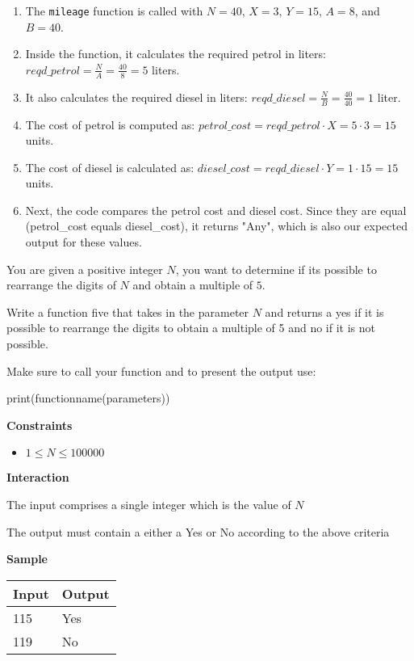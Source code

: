 \documentclass[a4paper]{exam}
\newcommand\heading[1]{\textbf{#1}}
\newcommand\alert[2]{\centerline{\textbf\large{\underline{\color{#1}{#2}}}}}
\begin{document}
\begin{questions}
\begin{enumerate}
    \item The \texttt{mileage} function is called with $N=40$, $X=3$, $Y=15$, $A=8$, and $B=40$.
    \item Inside the function, it calculates the required petrol in liters: $reqd\_petrol = \frac{N}{A} = \frac{40}{8} = 5$ liters.
    \item  It also calculates the required diesel in liters: $reqd\_diesel = \frac{N}{B} = \frac{40}{40} = 1$ liter.
    \item The cost of petrol is computed as: $petrol\_cost = reqd\_petrol \cdot X = 5 \cdot 3 = 15$ units.
    \item The cost of diesel is calculated as: $diesel\_cost = reqd\_diesel \cdot Y = 1 \cdot 15 = 15$ units.
    \item Next, the code compares the petrol cost and diesel cost. Since they are equal (petrol\_cost equals diesel\_cost), it returns "Any", which is also our expected output for these values.    
\end{enumerate}


\alert{Green} {This means the applied logic is correct}


    You are given a positive integer $N$, you want to determine if its possible to rearrange the digits of $N$ and obtain a multiple of $5$.

    Write a function five that takes in the parameter $N$ and returns a yes if it is possible to rearrange the digits to obtain a multiple of 5 and no if it is not possible.

    Make sure to call your function and to present the output use:

    print(functionname(parameters))

    \heading{Constraints}
    \begin{itemize}
        \item $ 1 \leq N \le 100000$

    \end{itemize}

    \heading{Interaction}

    The input comprises a single integer which is the value of $N$

    The output must contain a either a Yes or No according to the above criteria

    \heading{Sample}

    \begin{tabularx}{\textwidth}{|X|X|}
        \rowcolor{gray!50}
        \hline
        Input & Output \\ \hline\hline
        115   & Yes    \\\hline
        119   & No     \\\hline
    \end{tabularx}


\end{questions}
\end{document}
